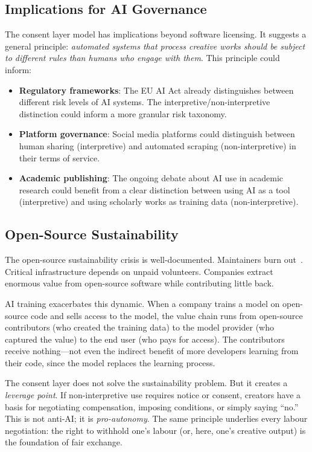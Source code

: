 \documentclass[11pt,twocolumn]{article}
\begin{document}
\subsection{Implications for AI Governance}

The consent layer model has implications beyond software licensing. It
suggests a general principle: \emph{automated systems that process
creative works should be subject to different rules than humans who
engage with them}. This principle could inform:

\begin{itemize}
    \item \textbf{Regulatory frameworks}: The EU AI Act already
          distinguishes between different risk levels of AI systems.
          The interpretive/non-interpretive distinction could inform
          a more granular risk taxonomy.
    \item \textbf{Platform governance}: Social media platforms could
          distinguish between human sharing (interpretive) and automated
          scraping (non-interpretive) in their terms of service.
    \item \textbf{Academic publishing}: The ongoing debate about AI use
          in academic research could benefit from a clear distinction
          between using AI as a tool (interpretive) and using scholarly
          works as training data (non-interpretive).
\end{itemize}

\subsection{Open-Source Sustainability}

The open-source sustainability crisis is well-documented. Maintainers
burn out~\cite{eghbal2020working}. Critical infrastructure depends on
unpaid volunteers. Companies extract enormous value from open-source
software while contributing little back.

AI training exacerbates this dynamic. When a company trains a model on
open-source code and sells access to the model, the value chain runs
from open-source contributors (who created the training data) to the
model provider (who captured the value) to the end user (who pays for
access). The contributors receive nothing---not even the indirect benefit
of more developers learning from their code, since the model replaces
the learning process.

The consent layer does not solve the sustainability problem. But it
creates a \emph{leverage point}. If non-interpretive use requires notice
or consent, creators have a basis for negotiating compensation, imposing
conditions, or simply saying ``no.'' This is not anti-AI; it is
\emph{pro-autonomy}. The same principle underlies every labour
negotiation: the right to withhold one's labour (or, here, one's
creative output) is the foundation of fair exchange.
\end{document}
